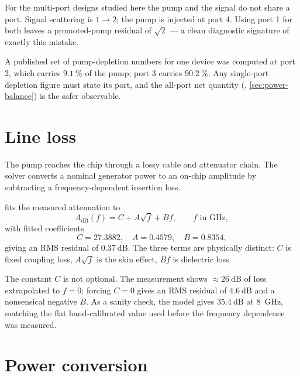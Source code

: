 For the multi-port designs studied here the pump and the signal do not share a
port. Signal scattering is $1\to 2$; the pump is injected at port 4. Using port
1 for both leaves a promoted-pump residual of $\sqrt{2}$ --- a clean diagnostic
signature of exactly this mistake.

\begin{caveat}
A published set of pump-depletion numbers for one device was computed at port 2,
which carries $\SI{9.1}{\percent}$ of the pump; port 3 carries
$\SI{90.2}{\percent}$. Any single-port depletion figure must state its port, and
the all-port net quantity (, \cref{sec:power-balance})
is the safer observable.
\end{caveat}

\section{Line loss}

The pump reaches the chip through a lossy cable and attenuator chain. The
solver converts a nominal generator power to an on-chip amplitude by
subtracting a frequency-dependent insertion loss.

\begin{implnote}
 fits the measured attenuation to
\begin{equation}
  A_{\mathrm{dB}}(f) = C + A\sqrt{f} + B f,
  \qquad f \text{ in } \si{\giga\hertz},
  \label{eq:loss-model}
\end{equation}
with fitted coefficients
\[
  C = 27.3882,\quad A = 0.4579,\quad B = 0.8354,
\]
giving an RMS residual of $\SI{0.37}{\dB}$. The three terms are physically
distinct: $C$ is fixed coupling loss, $A\sqrt{f}$ is the skin effect, $Bf$ is
dielectric loss.

The constant $C$ is not optional. The measurement shows $\approx\SI{26}{\dB}$
of loss extrapolated to $f=0$; forcing $C=0$ gives an RMS residual of
$\SI{4.6}{\dB}$ and a nonsensical negative $B$. As a sanity check, the model
gives $\SI{35.4}{\dB}$ at \SI{8}{\giga\hertz}, matching the flat
band-calibrated value used before the frequency dependence was measured.
\end{implnote}

\section{Power conversion}
\label{sec:power-conversion}

